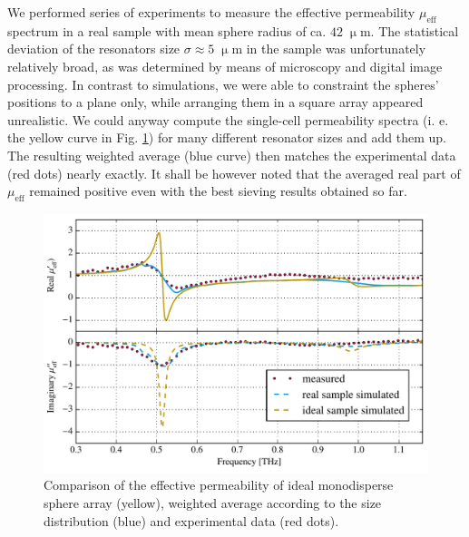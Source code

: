 \documentclass[letterpaper,12pt]{report}
\begin{document}
We performed series of experiments to measure the effective permeability  $\mu_{\text{eff}}$ spectrum in a real sample with mean sphere radius of ca. $42\;\upmu$m. The statistical deviation of the resonators size $\sigma \approx 5\;\upmu$m in the sample was unfortunately relatively broad, as was determined by means of microscopy and digital image processing. In contrast to simulations, we were able to constraint the spheres' positions to a plane only, while arranging them in a square array appeared unrealistic. We could anyway compute the single-cell permeability spectra (i. e. the yellow curve in Fig. \ref{fg_experimentalConv}) for many different resonator sizes and add them up. The resulting weighted average (blue curve) then matches the experimental data (red dots) nearly exactly. It shall be however noted that the averaged real part of $\mu_{\text{eff}}$ remained positive even with the best sieving results obtained so far.
\begin{figure}[ht]  \caption{Comparison of the effective permeability of ideal monodisperse sphere array (yellow), weighted average according to the size distribution (blue) and experimental data (red dots).}
\label{fg_experimentalConv} \centering 
\includegraphics[width=12cm]{img/Spheres_FDTD_experimentalConv.pdf}
\end{figure}
\end{document}
